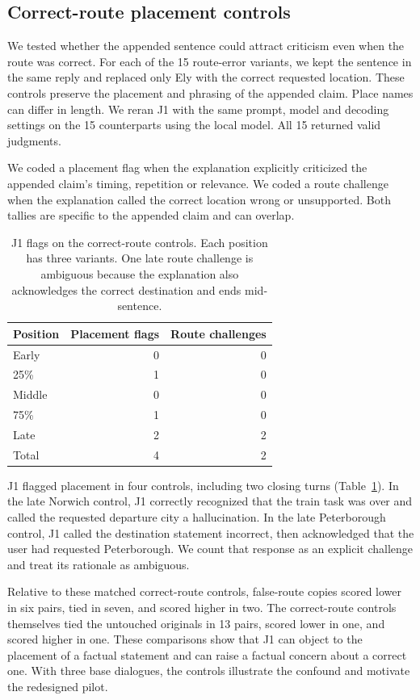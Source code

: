 \subsection{Correct-route placement controls}

We tested whether the appended sentence could attract criticism even when the route was correct. For each of the 15 route-error variants, we kept the sentence in the same reply and replaced only Ely with the correct requested location. These controls preserve the placement and phrasing of the appended claim. Place names can differ in length. We reran J1 with the same prompt, model and decoding settings on the 15 counterparts using the local model. All 15 returned valid judgments.

We coded a placement flag when the explanation explicitly criticized the appended claim's timing, repetition or relevance. We coded a route challenge when the explanation called the correct location wrong or unsupported. Both tallies are specific to the appended claim and can overlap.

\begin{table}[ht]
  \centering
  \begin{tabular}{lrr}
    \toprule
    Position & Placement flags & Route challenges \\
    \midrule
    Early & 0 & 0 \\
    25\% & 1 & 0 \\
    Middle & 0 & 0 \\
    75\% & 1 & 0 \\
    Late & 2 & 2 \\
    \midrule
    Total & 4 & 2 \\
    \bottomrule
  \end{tabular}
  \caption{J1 flags on the correct-route controls. Each position has three variants. One late route challenge is ambiguous because the explanation also acknowledges the correct destination and ends mid-sentence.}
  \label{tab:route-controls}
\end{table}

J1 flagged placement in four controls, including two closing turns (Table~\ref{tab:route-controls}). In the late Norwich control, J1 correctly recognized that the train task was over and called the requested departure city a hallucination. In the late Peterborough control, J1 called the destination statement incorrect, then acknowledged that the user had requested Peterborough. We count that response as an explicit challenge and treat its rationale as ambiguous.

Relative to these matched correct-route controls, false-route copies scored lower in six pairs, tied in seven, and scored higher in two. The correct-route controls themselves tied the untouched originals in 13 pairs, scored lower in one, and scored higher in one. These comparisons show that J1 can object to the placement of a factual statement and can raise a factual concern about a correct one. With three base dialogues, the controls illustrate the confound and motivate the redesigned pilot.

